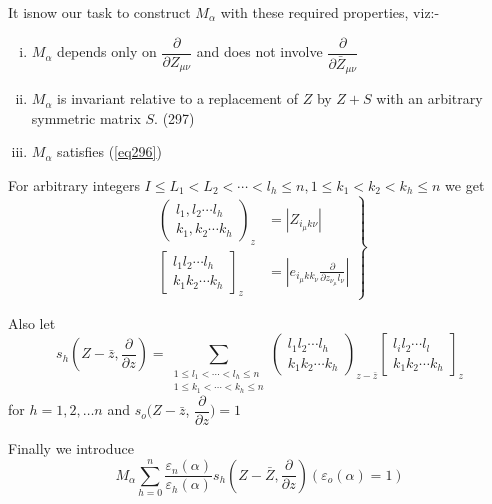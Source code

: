It is\pageoriginale now our task to construct $M_\alpha$ with these
required properties, viz:-  
\begin{enumerate}[(i)] 
\item $M_\alpha$ depends only on $\dfrac{\partial}{\partial Z_{\mu
    \nu}}$ and does not involve $\dfrac{\partial}{\partial
  \bar{Z}_{\mu \nu}}$ 

\item $M_\alpha$ is invariant relative to a replacement of $Z$ by $Z+
  S$ with an arbitrary symmetric matrix $S$. \hfill (297) 

\item $M_\alpha$ satisfies (\ref{eq296})
\end{enumerate}

For arbitrary integers $I \le L_1 < L_2 <  \cdots < l_h \le n, 1 \le
k_1 < k_2 < k_h \le n $ we get  
\begin{equation*}
\left.
\begin{aligned}
\begin{pmatrix} l_1, l_2 \cdots l_h\\ k_1, k_2 \cdots
  k_h \end{pmatrix}_z & = | Z_{i_\mu k \nu}|\\[4pt] 
\begin{bmatrix} l_1 l_2 \cdots l_h\\ k_1 k_2 \cdots
  k_h \end{bmatrix}_z & = |e_{i_\mu kk_\nu} \frac{\partial}{\partial
  z_{\nu_\mu} l_\nu}|  
\end{aligned}
\right \} \tag{298}\label{eq298}    
\end{equation*}

Also let
\begin{equation*}
s_h (Z - \bar{z}, \frac{\partial}{\partial z}) = \sum_{\substack{ 1
    \le l_1 < \cdots < l_h \le n \\ 1 \le k_1 < \cdots < k_h \le
    n}} \begin{pmatrix} l_1 l_2 \cdots l_h \\ k_1 k_2 \cdots
  k_h \end{pmatrix}_{z - \bar{z}} \begin{bmatrix} l_i l_2 \cdots l_l
  \\ k_1 k_2 \cdots k_h \end{bmatrix}_z \tag{299}\label{eq299}     
\end{equation*}
for $h = 1,2, \ldots n$ and $s_o (Z - \bar{z}$,
$\dfrac{\partial}{\partial  z}) = 1$ 

Finally we introduce 
\begin{equation*}
M_\alpha \sum^n_{h = 0} \frac{\varepsilon_n (\alpha)}{\varepsilon_h
  (\alpha)} s_h (Z - \bar{Z}, \frac{\partial}{\partial z})
(\varepsilon_o (\alpha) = 1) \tag{300}\label{eq300}     
\end{equation*}

